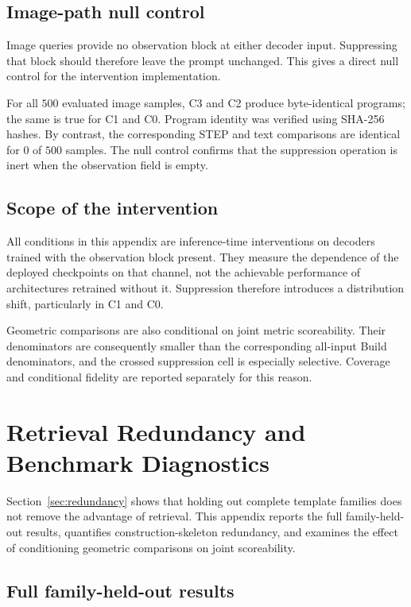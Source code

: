 \documentclass[preprint,12pt]{elsarticle}
\begin{document}
\subsection{Image-path null control}
\label{app:null_control}

Image queries provide no observation block at either decoder input. Suppressing that block
should therefore leave the prompt unchanged. This gives a direct null control for the
intervention implementation.

For all $500$ evaluated image samples, C3 and C2 produce byte-identical programs; the same is
true for C1 and C0. Program identity was verified using SHA-256 hashes. By contrast, the
corresponding STEP and text comparisons are identical for $0$ of $500$ samples. The null
control confirms that the suppression operation is inert when the observation field is empty.


\subsection{Scope of the intervention}
\label{app:intervention_scope}

All conditions in this appendix are inference-time interventions on decoders trained with the
observation block present. They measure the dependence of the deployed checkpoints on that
channel, not the achievable performance of architectures retrained without it. Suppression
therefore introduces a distribution shift, particularly in C1 and C0.

Geometric comparisons are also conditional on joint metric scoreability. Their denominators
are consequently smaller than the corresponding all-input Build denominators, and the crossed
suppression cell is especially selective. Coverage and conditional fidelity are reported
separately for this reason.


\section{Retrieval Redundancy and Benchmark Diagnostics}
\label{app:redundancy}

Section~\ref{sec:redundancy} shows that holding out complete template families does not remove the advantage of retrieval. This appendix reports the full family-held-out results, quantifies construction-skeleton redundancy, and examines the effect of conditioning geometric comparisons on joint scoreability.

\subsection{Full family-held-out results}
\label{app:family_heldout}
\end{document}
